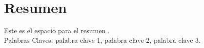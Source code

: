 \chapter*{Resumen}

Este es el espacio para el resumen .\\ 



\vspace{\fill} 
Palabras Claves: palabra clave 1, palabra clave 2, palabra clave 3.
\vspace{20px} 